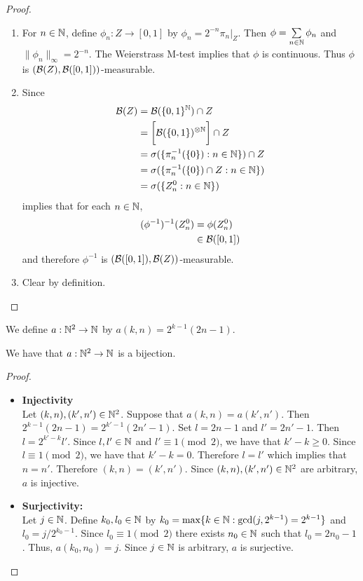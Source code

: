 \documentclass{book}
\begin{document}
	\begin{proof}\
		\begin{enumerate}
			\item For $n \in \mathbb{N}$, define $\phi_n: Z \rightarrow [0, 1]$ by $\phi_n = 2^{-n}\pi_n|_{Z}$. Then $\phi = \sum\limits_{n \in \mathbb{N}} \phi_n$ and $\|\phi_n\|_{\infty} = 2^{-n}$. The Weierstrass M-test implies that $\phi$ is continuous. Thus $\phi$ is $(\mathcal{B}(Z), \mathcal{B}([0,1]))$-measurable. \\
			\item Since 
			\begin{align*}
				\mathcal{B}(Z) 
				& = \mathcal{B}(\{0, 1\}^{\mathbb{N}}) \cap Z \\
				& = \bigg[ \mathcal{B}(\{0,1\})^{\otimes \mathbb{N}} \bigg] \cap Z \\
				& = \sigma(\{\pi_n^{-1}(\{0\}): n \in \mathbb{N}\}) \cap Z \\
				& = \sigma (\{\pi_n^{-1}(\{0\}) \cap Z: n \in \mathbb{N}\} )\\
				& = \sigma (\{Z_n^0: n \in \mathbb{N}\})
			\end{align*}
			 implies that for each $n \in \mathbb{N}$, 
			\begin{align*}
				(\phi^{-1})^{-1} (Z_n^0) 
				& = \phi(Z_n^0) \\
				& \in \mathcal{B}([0,1]) \\
			\end{align*}
			and therefore $\phi^{-1}$ is $(\mathcal{B}([0,1]), \mathcal{B}(Z))$-measurable.
			\item Clear by definition.
		\end{enumerate}
	\end{proof}
	
	\begin{defn}
		We define $a: \mathbb{N}^2 \rightarrow \mathbb{N}$ by $a(k,n) = 2^{k-1}(2n-1)$. 
	\end{defn}
	
	\begin{ex}
		We have that $a: \mathbb{N}^2 \rightarrow \mathbb{N}$ is a bijection.
	\end{ex}
	
	\begin{proof}\
		\begin{itemize}
			\item \textbf{Injectivity} \\ 
			Let $(k,n), (k', n') \in \mathbb{N}^2$. Suppose that $a(k,n) = a(k',n')$. Then $2^{k-1}(2n-1) = 2^{k'-1}(2n'-1)$. Set $l = 2n-1$ and $l' = 2n'-1$. Then $l = 2^{k'-k}l'$. Since $l,l' \in \mathbb{N}$ and $l' \equiv 1 \pmod{2}$, we have that $k'-k \geq 0$. Since $l \equiv 1 \pmod{2}$, we have that $k'-k = 0$. Therefore $l = l'$ which implies that $n = n'$. Therefore $(k,n) = (k', n')$. Since  $(k,n), (k', n') \in \mathbb{N}^2$ are arbitrary, $a$ is injective.
			\item \textbf{Surjectivity:} \\
			Let $j \in \mathbb{N}$. Define $k_0,l_0 \in \mathbb{N}$ by $k_0 = \max \{k \in \mathbb{N}: \gcd(j, 2^{k-1}) = 2^{k-1}\}$ and $l_0 = j/2^{k_0-1}$. Since $l_0 \equiv 1 \pmod{2}$ there exists $n_0 \in \mathbb{N}$ such that $l_0 = 2n_0-1$. Thus, $a(k_0, n_0) = j$. Since $j \in \mathbb{N}$ is arbitrary, $a$ is surjective.
		\end{itemize}
	\end{proof}
	
\end{document}
